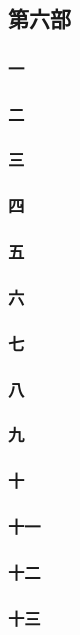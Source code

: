 \subsection*{第六部}





\subsubsection*{一}
\subsubsection*{二}
\subsubsection*{三}
\subsubsection*{四}
\subsubsection*{五}
\subsubsection*{六}
\subsubsection*{七}
\subsubsection*{八}
\subsubsection*{九}
\subsubsection*{十}
\subsubsection*{十一}
\subsubsection*{十二}
\subsubsection*{十三}
